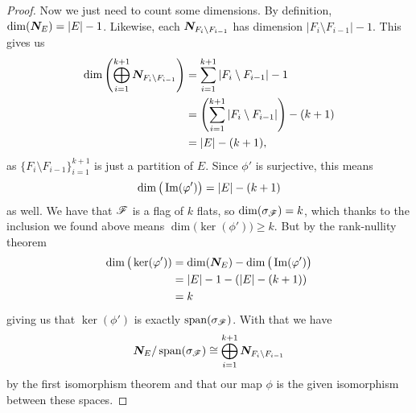 \documentclass[12pt,oneside]{../../sfsuthesis}
\begin{document}
\begin{proof}
    Now we just need to count some dimensions.
    By definition, \( \dim(\bm{N}_E) = | E | - 1 \).
    Likewise, each \( \bm{N}_{F_i \setminus F_{i-1}} \) has dimension \( | F_i \setminus F_{i-1} | - 1 \).
    This gives us
    \begin{align*}
        \dim\left( \bigoplus_{i=1}^{k+1} \bm{N}_{F_i \setminus F_{i-1}} \right) & = \sum_{i=1}^{k+1} | F_i \setminus F_{i-1} | - 1                    \\
                                                                             & = \left(\sum_{i=1}^{k+1} | F_i \setminus F_{i-1} |\right) - (k + 1) \\
                                                                             & = | E | - (k + 1),
    \end{align*}
    as \( \{  F_i \setminus F_{i-1} \}_{i=1}^{k+1} \) is just a partition of \( E \).
    Since \( \phi' \) is surjective, this means
    \[
        \dim\big(\operatorname{Im}(\varphi')\big) = | E | - (k + 1)
    \]
    as well.
    We have that \( \mathscr{F} \) is a flag of \( k \) flats, so \( \dim(\sigma_{\mathscr{F}}) = k \), which thanks to the inclusion we found above means \( \dim\big(\ker(\phi')\big) \geq k \).
    But by the rank-nullity theorem
    \begin{align*}
        \dim\big(\ker(\varphi')) & = \dim(\bm{N}_E) - \dim\big( \operatorname{Im}(\varphi') \big)  \\
                              & = | E | - 1 - \left( | E | - (k + 1)\right) \\
                              & = k
    \end{align*}
    giving us that \( \ker(\phi') \) is exactly \( \operatorname{span}(\sigma_{\mathscr{F}}) \).
    With that we have
    \[
        \bm{N}_E/ \operatorname{span}(\sigma_{\mathscr{F}}) \cong \bigoplus_{i=1}^{k+1} \bm{N}_{F_i \setminus F_{i-1}}
    \]
    by the first isomorphism theorem and that our map \( \phi \) is the given isomorphism between these spaces.
\end{proof}
\end{document}
